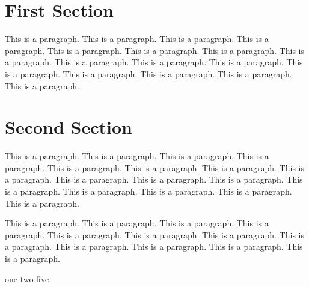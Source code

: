 \documentclass{article}
\begin{document}
\section{First Section}

This is a paragraph. This is a paragraph. This is a paragraph. This is a paragraph. 
This is a paragraph. This is a paragraph. This is a paragraph. This is a paragraph. 
This is a paragraph. This is a paragraph. This is a paragraph. This is a paragraph. 
This is a paragraph. This is a paragraph. This is a paragraph. This is a paragraph. 

\section{Second Section}

This is a paragraph. This is a paragraph. This is a paragraph. This is a paragraph. 
This is a paragraph. This is a paragraph. This is a paragraph. This is a paragraph. 
This is a paragraph. This is a paragraph. This is a paragraph. This is a paragraph. 
This is a paragraph. This is a paragraph. This is a paragraph. This is a paragraph. 

This is a paragraph. This is a paragraph. This is a paragraph. This is a paragraph. 
This is a paragraph. This is a paragraph. This is a paragraph. This is a paragraph. 
This is a paragraph. This is a paragraph. This is a paragraph. This is a paragraph. 

\begin{algorithm}[H]
    one \;%
    two \;%
    five
\end{algorithm}
\end{document}
